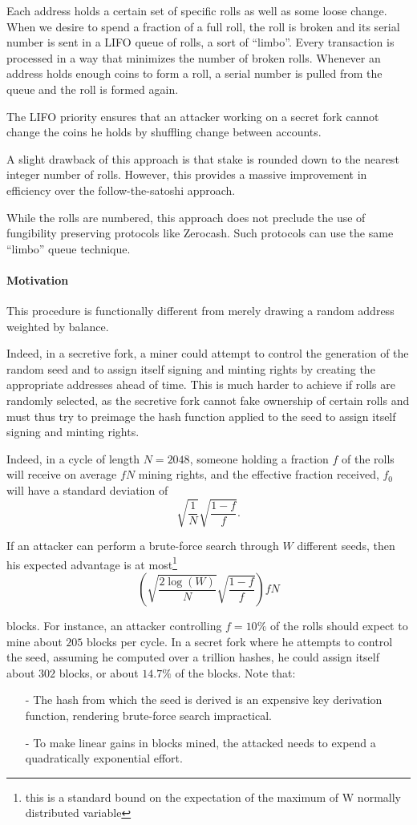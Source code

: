 \documentclass[letterpaper]{article}
\begin{document}
Each address holds a certain set of specific rolls as well as some loose change.
When we desire to spend a fraction of a full roll, the roll is broken and
its serial number is sent in a LIFO queue of rolls, a sort of ``limbo''. Every
transaction is processed in a way that minimizes the number of broken rolls.
Whenever an address holds enough coins to form a roll, a serial number is pulled
from the queue and the roll is formed again.

The LIFO priority ensures that an attacker working on a secret fork cannot
change the coins he holds by shuffling change between accounts.

A slight drawback of this approach is that stake is rounded down to the
nearest integer number of rolls. However, this provides a massive improvement
in efficiency over the follow-the-satoshi approach.

While the rolls are numbered, this approach does not preclude the use of 
fungibility preserving protocols like Zerocash. Such protocols can use
the same ``limbo'' queue technique.

\paragraph{Motivation}
This procedure is functionally different from merely drawing a random address
weighted by balance.

Indeed, in a secretive fork, a miner could attempt to control the generation of
the random seed and to assign itself signing and minting rights by creating the
appropriate addresses ahead of time. This is much harder to achieve if rolls
are randomly selected, as the secretive fork cannot fake ownership of certain
rolls and must thus try to preimage the hash function applied to the seed to
assign itself signing and minting rights. 

Indeed, in a cycle of length $N=\num{2048}$, someone holding a fraction $f$ of
the rolls will receive on average $f N$ mining rights, and the effective
fraction received, $f_0$ will have a standard deviation of
$$\sqrt{\frac{1}{N}}\sqrt{\frac{1-f}{f}}.$$

If an attacker can perform a brute-force search through $W$ different seeds,
then his expected advantage is at most\footnote{this is a standard bound
on the expectation of the maximum of W normally distributed variable}
$$\left(\sqrt{\frac{2\log(W)}{N}}\sqrt{\frac{1-f}{f}}\right)fN$$

blocks. For instance, an attacker controlling $f = 10\%$ of the rolls should
expect  to mine about $205$ blocks per cycle. In a secret fork where he attempts
to control the seed, assuming he computed over a trillion hashes, he could
assign itself about $302$ blocks, or about $14.7\%$ of the blocks. Note that:
\begin{itemize}
\item[-] The hash from which the seed is derived is an expensive key derivation
function, rendering brute-force search impractical.
\item[-] To make linear gains in blocks mined, the attacked needs to expend a
quadratically exponential effort.
\end{itemize}  
\end{document}
